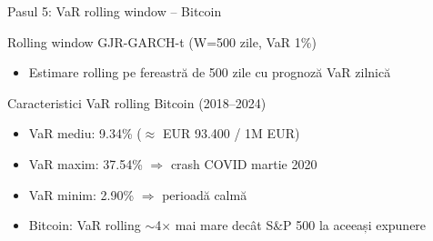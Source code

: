 \documentclass[9pt, aspectratio=169, t]{beamer}
\begin{document}
\begin{frame}{Pasul 5: VaR rolling window -- Bitcoin}
    \small
    \begin{block}{Rolling window GJR-GARCH-t (W=500 zile, VaR 1\%)}
        \begin{itemize}
            \item Estimare rolling pe fereastră de 500 zile cu prognoză VaR zilnică
        \end{itemize}
    \end{block}
    \begin{exampleblock}{Caracteristici VaR rolling Bitcoin (2018--2024)}
        \begin{itemize}
            \item VaR mediu: 9.34\% ($\approx$ EUR 93.400 / 1M EUR)
            \item VaR maxim: 37.54\% $\Rightarrow$ crash COVID martie 2020
            \item VaR minim: 2.90\% $\Rightarrow$ perioadă calmă
            \item Bitcoin: VaR rolling $\sim$4$\times$ mai mare decât S\&P 500 la aceeași expunere
        \end{itemize}
    \end{exampleblock}
\end{frame}
\end{document}
